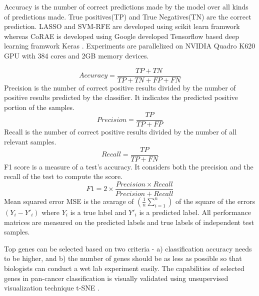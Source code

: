 \documentclass{bioinfo}
\begin{document}
{Accuracy is the number of correct predictions made by the model over all kinds of predictions made. True positives(TP) and True Negatives(TN) are the correct prediction. LASSO and SVM-RFE are developed using scikit learn framwork \cite{scikit-learn} whereas CoRAE is developed using Google developed Tensorflow \cite{tensorflow2015-whitepaper} based deep learning framwork Keras \cite{chollet2015keras}. Experiments are parallelized on NVIDIA Quadro K620 GPU with 384 cores and 2GB memory devices.

    \begin{equation}
        Accuracy = \frac{TP+TN}{TP+TN+FP+FN}
    \end{equation}
    Precision is the number of correct positive results divided by the number of positive results predicted by the classifier. It indicates the predicted positive portion of the samples. 
    \begin{equation}
        Precision = \frac{TP}{TP+FP}
    \end{equation}
    Recall is the number of correct positive results divided by the number of all relevant samples.
    \begin{equation}
        Recall = \frac{TP}{TP+FN}
    \end{equation}
	F1 score is a measure of a test's accuracy. It considers both the precision and the recall of the test to compute the score.
	\begin{equation}
        F1 = 2 \times \frac{Precision \times Recall}{Precision + Recall}
    \end{equation}
    Mean squared error MSE is the avarage of $(\frac{1}{n} \sum _{i=1} ^n)$ of the square of the errors $(Y_i - Y'_i)$ where $Y_i$ is a true label and $Y'_i$ is a predicted label. All performance matrices are measured on the predicted labels and true labels of independent test samples. 

Top genes can be selected based on two criteria - a) classification accuracy needs to be higher,
and b) the number of genes should be as less as possible so that biologists can conduct a wet lab experiment
easily. The capabilities of selected genes in pan-cancer classification is visually validated using unsupervised visualization technique t-SNE \cite{maaten2008visualizing}.


}
\end{document}
